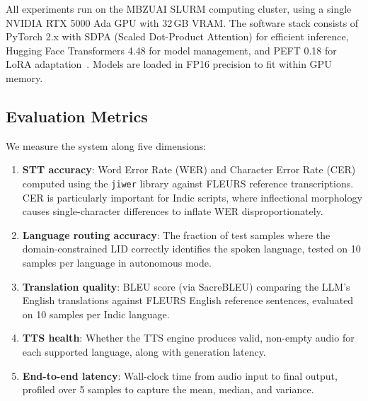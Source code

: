 All experiments run on the MBZUAI SLURM computing cluster, using a single NVIDIA RTX 5000 Ada GPU with 32\,GB VRAM. The software stack consists of PyTorch 2.x with SDPA (Scaled Dot-Product Attention) for efficient inference, Hugging Face Transformers 4.48 for model management, and PEFT 0.18 for LoRA adaptation~\cite{peft2023, wolf2020transformers}. Models are loaded in FP16 precision to fit within GPU memory.

\subsection{Evaluation Metrics}

We measure the system along five dimensions:

\begin{enumerate}[leftmargin=*]
    \item \textbf{STT accuracy}: Word Error Rate (WER) and Character Error Rate (CER) computed using the \texttt{jiwer} library against FLEURS reference transcriptions. CER is particularly important for Indic scripts, where inflectional morphology causes single-character differences to inflate WER disproportionately.

    \item \textbf{Language routing accuracy}: The fraction of test samples where the domain-constrained LID correctly identifies the spoken language, tested on 10 samples per language in autonomous mode.

    \item \textbf{Translation quality}: BLEU score (via SacreBLEU) comparing the LLM's English translations against FLEURS English reference sentences, evaluated on 10 samples per Indic language.

    \item \textbf{TTS health}: Whether the TTS engine produces valid, non-empty audio for each supported language, along with generation latency.

    \item \textbf{End-to-end latency}: Wall-clock time from audio input to final output, profiled over 5 samples to capture the mean, median, and variance.
\end{enumerate}
